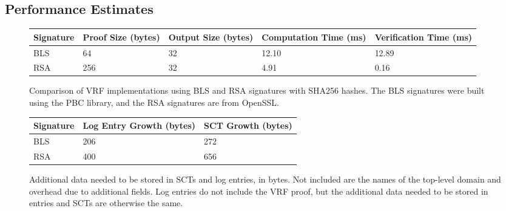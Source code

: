\documentclass[letterpaper,twocolumn,10pt]{article}
\begin{document}
\subsection{Performance Estimates}
\begin{center}
\begin{figure*}
    \begin{tabular}{ | l | l | l | l | l |}
    \hline
    Signature & Proof Size (bytes) & Output Size (bytes) & Computation Time (ms) & Verification Time (ms) \\ \hline
    BLS & 64 & 32 & 12.10 & 12.89 \\ \hline
    RSA & 256 & 32 & 4.91 & 0.16 \\
    \hline
    \end{tabular}
    \caption{Comparison of VRF implementations using BLS and RSA signatures with SHA256 hashes. The BLS signatures were built using the PBC library, and the RSA signatures are from OpenSSL.}
\label{VRF_perf}
\end{figure*}
\end{center}
\begin{center}
\begin{figure*}
    \begin{tabular}{ | l | l | l |}
    \hline
    Signature & Log Entry Growth (bytes) & SCT Growth (bytes) \\ \hline
    BLS & 206 & 272 \\ \hline
    RSA & 400 & 656 \\
    \hline
    \end{tabular}
    \caption{Additional data needed to be stored in SCTs and log entries, in bytes. Not included are the names of the top-level domain and overhead due to additional fields. Log entries do not include the VRF proof, but the additional data needed to be stored in entries and SCTs are otherwise the same.}
\label{VRF_bloat}
\end{figure*}
\end{center}
\end{document}
